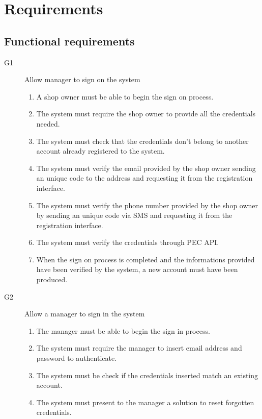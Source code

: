 \section{Requirements}
\label{sect:Specificrequirements}

\subsection{Functional requirements}
\label{subsect:functionalrequirements}

\begin{description}
    \item [G1] Allow manager to sign on the system
        \begin{enumerate}[label=\textbf{R\arabic*}]
            \item A shop owner must be able to begin the sign on process.
            \item The system must require the shop owner to provide all the credentials needed.
            \item The system must check that the credentials don't belong to another account already registered to the system.
            \item The system must verify the email provided by the shop owner sending an unique code to the address and requesting it from the registration interface.
            \item The system must verify the phone number provided by the shop owner by sending an unique code via SMS and requesting it from the registration interface.
            \item The system must verify the credentials through PEC API.
            \item When the sign on process is completed and the informations provided have been verified by the system, a new account must have been produced.
        \end{enumerate}
    \item [G2] Allow a manager to sign in the system
        \begin{enumerate}[resume*]
            \item The manager must be able to begin the sign in process.
            \item The system must require the manager to insert email address and password to authenticate.
            \item The system must be check if the credentials inserted match an existing account.
            \item The system must present to the manager a solution to reset forgotten credentials.

\end{enumerate}
\end{description}
